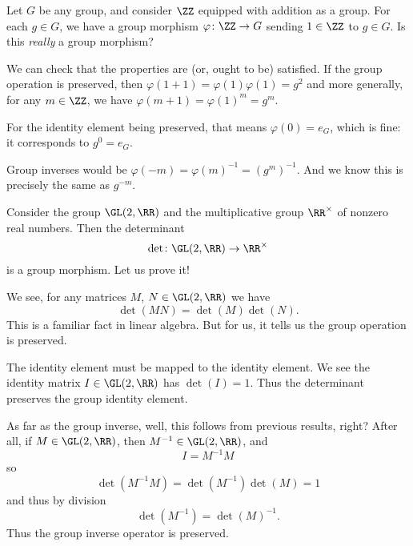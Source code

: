 \begin{example}
  Let $G$ be any group, and consider $\ZZ$ equipped with addition as a
  group. For each $g\in G$, we have a group morphism
  $\varphi\colon\ZZ\to G$ sending $1\in\ZZ$ to $g\in G$. Is this
  \emph{really} a group morphism?

  We can check that the properties are (or, ought to be) satisfied. If
  the group operation is preserved, then
  $\varphi(1+1)=\varphi(1)\varphi(1)=g^{2}$ and more generally, for any
  $m\in\ZZ$, we have
  $\varphi(m+1)=\varphi(1)^{m}=g^{m}$.

  For the identity element being preserved, that means
  $\varphi(0)=e_{G}$, which is fine: it corresponds to $g^{0}=e_{G}$.

  Group inverses would be
  $\varphi(-m)=\varphi(m)^{-1}=(g^{m})^{-1}$. And we know this is
  precisely the same as $g^{-m}$.
\end{example}

\begin{example}
  Consider the group $\GL(2,\RR)$ and the multiplicative group
  $\RR^{\times}$ of nonzero real numbers. Then the determinant
  \begin{equation}
    \det\colon\GL(2,\RR)\to\RR^{\times}
  \end{equation}
  is a group morphism. Let us prove it!

  We see, for any matrices $M$, $N\in\GL(2,\RR)$ we have
  \begin{equation}
    \det(MN)=\det(M)\det(N).
  \end{equation}
  This is a familiar fact in linear algebra. But for us, it tells us the
  group operation is preserved.

  The identity element must be mapped to the identity element. We see
  the identity matrix $I\in\GL(2,\RR)$ has $\det(I)=1$. Thus the
  determinant preserves the group identity element.

  As far as the group inverse, well, this follows from previous results,
  right? After all, if $M\in\GL(2,\RR)$, then $M^{-1}\in\GL(2,\RR)$, and
  \begin{equation}
    I = M^{-1}M
  \end{equation}
  so
  \begin{equation}
    \det(M^{-1}M)=\det(M^{-1})\det(M)=1
  \end{equation}
  and thus by division
  \begin{equation}
    \det(M^{-1})=\det(M)^{-1}.
  \end{equation}
  Thus the group inverse operator is preserved.
\end{example}


